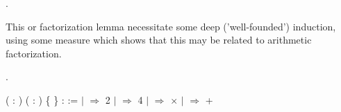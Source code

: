 \coqdocemptyline
\begin{coqdoccode}
\coqdocemptyline
\coqdocnoindent
{} .\coqdoceol
\end{coqdoccode}
This  or factorization lemma necessitate some deep ('well-founded') induction,
using some measure  which shows that this may be related to
arithmetic factorization. \begin{coqdoccode}
\coqdocnoindent
{} .\coqdoceol
\end{coqdoccode}
\coqdoceol
\coqdocemptyline
\coqdocnoindent
{}  (  : ) ( :   ) \{ \} :  :=\coqdoceol
\coqdocindent{1.00em}
  \coqdoceol
\coqdocindent{1.00em}
\ensuremath{|}  \coqdocvar{\_} \ensuremath{\Rightarrow} 2\coqdoceol
\coqdocindent{1.00em}
\ensuremath{|}  \coqdocvar{\_} \coqdocvar{\_} \coqdocvar{\_} \ensuremath{\Rightarrow} 4\coqdoceol
\coqdocindent{1.00em}
\ensuremath{|}        \ensuremath{\Rightarrow}     \ensuremath{\times}    \coqdoceol
\coqdocindent{1.00em}
\ensuremath{|}       \ensuremath{\Rightarrow}     +    \coqdoceol
\coqdocindent{1.00em}

